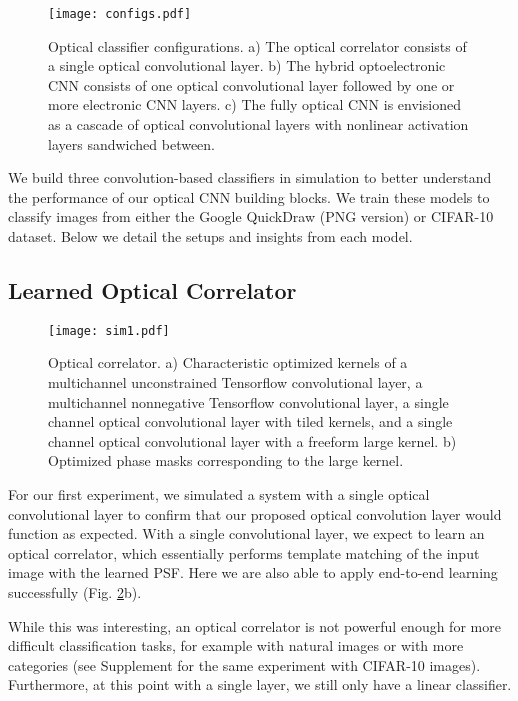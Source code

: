 \begin{figure}[ht]
\centering
\texttt{[image: configs.pdf]}
\caption{Optical classifier configurations. a) The optical correlator consists of a single optical convolutional layer. b) The hybrid optoelectronic CNN consists of one optical convolutional layer followed by one or more electronic CNN layers. c) The fully optical CNN is envisioned as a cascade of optical convolutional layers with nonlinear activation layers sandwiched between. }
\label{fig:configs}
\end{figure}

We build three convolution-based classifiers in simulation to better understand the performance of our optical CNN building blocks. We train these models to classify images from either the Google QuickDraw (PNG version) or CIFAR-10 dataset. Below we detail the setups and insights from each model. 


\subsection*{Learned Optical Correlator}

\begin{figure}[ht]
\centering
\texttt{[image: sim1.pdf]}
\caption{Optical correlator. a) Characteristic optimized kernels of a multichannel unconstrained Tensorflow convolutional layer, a multichannel nonnegative Tensorflow convolutional layer, a single channel optical convolutional layer with tiled kernels, and a single channel optical convolutional layer with a freeform large kernel. b) Optimized phase masks corresponding to the large kernel.}
\label{fig:sim1}
\end{figure}

For our first experiment, we simulated a system with a single optical convolutional layer to confirm that our proposed optical convolution layer would function as expected. With a single convolutional layer, we expect to learn an optical correlator, which essentially performs template matching of the input image with the learned PSF. Here we are also able to apply end-to-end learning successfully (Fig. \ref{fig:sim1}b).

While this was interesting, an optical correlator is not powerful enough for more difficult classification tasks, for example with natural images or with more categories (see Supplement for the same experiment with CIFAR-10 images). Furthermore, at this point with a single layer, we still only have a linear classifier.

